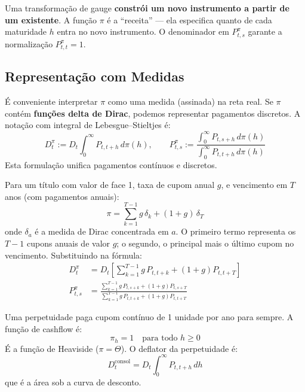 \begin{obs}
Uma transforma\c{c}\~ao de gauge \textbf{constr\'oi um novo instrumento
a partir de um existente}. A fun\c{c}\~ao $\pi$ \'e a ``receita'' ---
ela especifica quanto de cada maturidade $h$ entra no novo
instrumento. O denominador em $P_{t,s}^\pi$ garante a
normaliza\c{c}\~ao $P_{t,t}^\pi = 1$.
\end{obs}

\subsection{Representa\c{c}\~ao com Medidas}

\'E conveniente interpretar $\pi$ como uma medida (assinada) na reta
real. Se $\pi$ cont\'em \textbf{fun\c{c}\~oes delta de Dirac}, podemos
representar pagamentos discretos. A nota\c{c}\~ao com integral de
Lebesgue--Stieltjes \'e:
\[
D_t^\pi := D_t \int_0^\infty P_{t,t+h}\,d\pi(h), \qquad
P_{t,s}^\pi := \frac{\int_0^\infty P_{t,s+h}\,d\pi(h)}
 {\int_0^\infty P_{t,t+h}\,d\pi(h)}
\]
Esta formula\c{c}\~ao unifica pagamentos cont\'inuos e discretos.

\begin{ex}\label{ex:coupon_bond}
Para um t\'itulo com valor de face 1, taxa de cupom anual $g$, e
vencimento em $T$ anos (com pagamentos anuais):
\[
\pi = \sum_{k=1}^{T-1} g\,\delta_{k} + (1+g)\,\delta_{T}
\]
onde $\delta_a$ \'e a medida de Dirac concentrada em $a$. O primeiro
termo representa os $T-1$ cupons anuais de valor $g$; o segundo, o
principal mais o \'ultimo cupom no vencimento. Substituindo na
f\'ormula:
\begin{align*}
 D_t^\pi &= D_t\left[\sum_{k=1}^{T-1} g\,P_{t,t+k} + (1+g)P_{t,t+T}\right] \\[4pt]
 P_{t,s}^\pi &= \frac{\sum_{k=1}^{T-1} g\,P_{t,s+k} + (1+g)P_{t,s+T}}
 {\sum_{k=1}^{T-1} g\,P_{t,t+k} + (1+g)P_{t,t+T}}
\end{align*}
\end{ex}

\begin{ex}\label{ex:consol}
Uma perpetuidade paga cupom cont\'inuo de 1 unidade por ano para
sempre. A fun\c{c}\~ao de cashflow \'e:
\[
\pi_h = 1 \quad \text{para todo } h \geq 0
\]
\'E a fun\c{c}\~ao de Heaviside ($\pi = \Theta$). O deflator da
perpetuidade \'e:
\[
D_t^{\text{consol}} = D_t \int_0^\infty P_{t,t+h}\,dh
\]
que \'e a \'area sob a curva de desconto.
\end{ex}

